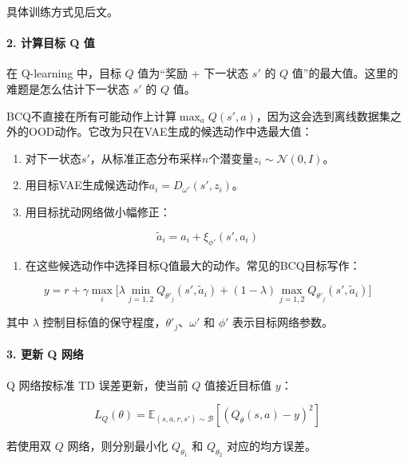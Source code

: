 具体训练方式见后文。

\hypertarget{ux8ba1ux7b97ux76eeux6807-q-ux503c}{%
\paragraph{2. 计算目标 Q 值}\label{ux8ba1ux7b97ux76eeux6807-q-ux503c}}

在 Q-learning 中，目标 \(Q\) 值为``奖励 + 下一状态 \(s'\) 的 \(Q\) 值''的最大值。这里的难题是怎么估计下一状态 \(s'\) 的 \(Q\) 值。

BCQ不直接在所有可能动作上计算\(\max_a Q(s',a)\)，因为这会选到离线数据集之外的OOD动作。它改为只在VAE生成的候选动作中选最大值：

\begin{enumerate}
\def\labelenumi{\arabic{enumi}.}
\tightlist
\item
  对下一状态\(s'\)，从标准正态分布采样\(n\)个潜变量\(z_i \sim \mathcal{N}(0,I)\)。
\item
  用目标VAE生成候选动作\(a_i = D_{\omega'}(s',z_i)\)。
\item
  用目标扰动网络做小幅修正：
\end{enumerate}

\[
\tilde a_i = a_i + \xi_{\phi'}(s',a_i)
\]

\begin{enumerate}
\def\labelenumi{\arabic{enumi}.}
\setcounter{enumi}{3}
\tightlist
\item
  在这些候选动作中选择目标Q值最大的动作。常见的BCQ目标写作：
\end{enumerate}

\[
y = r + \gamma \max_i \bigl[
\lambda \min_{j=1,2} Q_{\theta'_j}(s', \tilde a_i)
+ (1-\lambda) \max_{j=1,2} Q_{\theta'_j}(s', \tilde a_i)
\bigr]
\]

其中 \(\lambda\) 控制目标值的保守程度，\(\theta'_j\)、\(\omega'\) 和 \(\phi'\) 表示目标网络参数。

\hypertarget{ux66f4ux65b0-q-ux7f51ux7edc}{%
\paragraph{3. 更新 Q 网络}\label{ux66f4ux65b0-q-ux7f51ux7edc}}

Q 网络按标准 TD 误差更新，使当前 \(Q\) 值接近目标值 \(y\)：

\[
L_Q(\theta)=\mathbb{E}_{(s,a,r,s')\sim\mathcal B}
[(Q_\theta(s,a)-y)^{2}]
\]

若使用双 \(Q\) 网络，则分别最小化 \(Q_{\theta_1}\) 和 \(Q_{\theta_2}\) 对应的均方误差。

